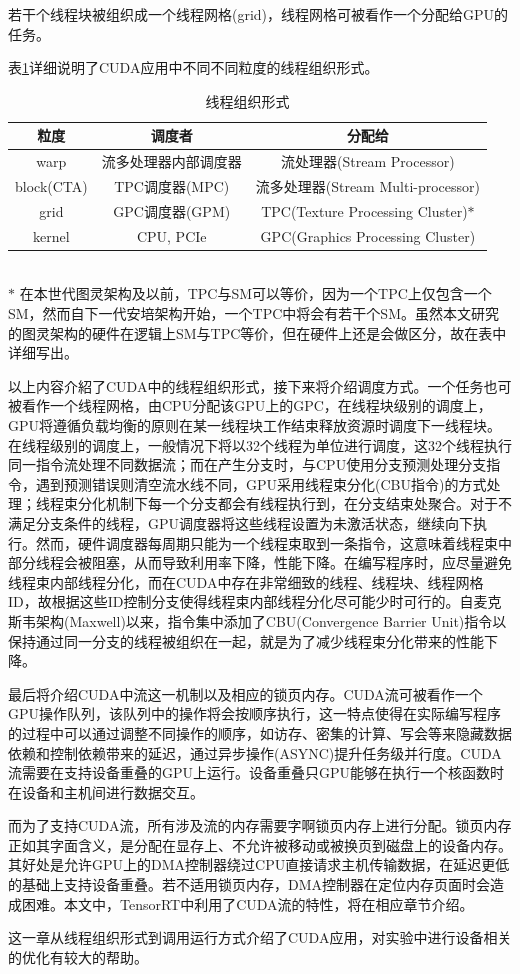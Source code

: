 \par 若干个线程块被组织成一个线程网格(grid)，线程网格可被看作一个分配给GPU的任务。
\par 表\ref{table-粒度}详细说明了CUDA应用中不同不同粒度的线程组织形式。
\begin{table}
	\centering
	\caption{线程组织形式}
	\begin{tabular}{ccc}
		\toprule
		粒度	&	调度者	& 	分配给 \\
		\midrule
		warp		&	流多处理器内部调度器	&	流处理器(Stream Processor)\\
		block(CTA)	&	TPC调度器(MPC)		  &		流多处理器(Stream Multi-processor)\\
		grid		&	GPC调度器(GPM)		  &		TPC(Texture Processing Cluster)$ * $\\
		kernel		&	CPU, PCIe			&		GPC(Graphics Processing Cluster)	\\	
		\bottomrule
	\end{tabular} \label{table-粒度}\\

$ * $ 在本世代图灵架构及以前，TPC与SM可以等价，因为一个TPC上仅包含一个SM，然而自下一代安培架构开始，一个TPC中将会有若干个SM。虽然本文研究的图灵架构的硬件在逻辑上SM与TPC等价，但在硬件上还是会做区分，故在表中详细写出\parencite{BLOCKDIAG}。
\end{table}
\par 以上内容介紹了CUDA中的线程组织形式，接下来将介绍调度方式。一个任务也可被看作一个线程网格，由CPU分配该GPU上的GPC，在线程块级别的调度上，GPU将遵循负载均衡的原则在某一线程块工作结束释放资源时调度下一线程块。在线程级别的调度上，一般情况下将以32个线程为单位进行调度，这32个线程执行同一指令流处理不同数据流；而在产生分支时，与CPU使用分支预测处理分支指令，遇到预测错误则清空流水线不同，GPU采用线程束分化(CBU指令)的方式处理；线程束分化机制下每一个分支都会有线程执行到，在分支结束处聚合。对于不满足分支条件的线程，GPU调度器将这些线程设置为未激活状态，继续向下执行。然而，硬件调度器每周期只能为一个线程束取到一条指令，这意味着线程束中部分线程会被阻塞，从而导致利用率下降，性能下降。在编写程序时，应尽量避免线程束内部线程分化，而在CUDA中存在非常细致的线程、线程块、线程网格ID，故根据这些ID控制分支使得线程束内部线程分化尽可能少时可行的\parencite{DIVER}。自麦克斯韦架构(Maxwell)以来，指令集中添加了CBU(Convergence Barrier Unit)指令以保持通过同一分支的线程被组织在一起，就是为了减少线程束分化带来的性能下降\parencite{THREADS}。
\par 最后将介绍CUDA中流这一机制以及相应的锁页内存。CUDA流可被看作一个GPU操作队列，该队列中的操作将会按顺序执行，这一特点使得在实际编写程序的过程中可以通过调整不同操作的顺序，如访存、密集的计算、写会等来隐藏数据依赖和控制依赖带来的延迟\parencite{STREAM}，通过异步操作(ASYNC)提升任务级并行度。CUDA流需要在支持设备重叠的GPU上运行。设备重叠只GPU能够在执行一个核函数时在设备和主机间进行数据交互。
\par 而为了支持CUDA流，所有涉及流的内存需要字啊锁页内存上进行分配。锁页内存正如其字面含义，是分配在显存上、不允许被移动或被换页到磁盘上的设备内存。其好处是允许GPU上的DMA控制器绕过CPU直接请求主机传输数据，在延迟更低的基础上支持设备重叠。若不适用锁页内存，DMA控制器在定位内存页面时会造成困难。本文中，TensorRT中利用了CUDA流的特性，将在相应章节介绍。
\par 这一章从线程组织形式到调用运行方式介绍了CUDA应用，对实验中进行设备相关的优化有较大的帮助。
